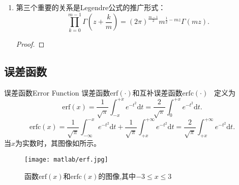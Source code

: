 \begin{property}
\begin{enumerate}[noitemsep]
\begin{enumerate}
			\item 第三个重要的关系是Legendre公式的推广形式：
			\begin{equation}
			\prod _{k=0}^{m-1}{\Gamma\left(z+\frac {k}{m}\right)}=\left(2\pi\right)^{\frac{m-1}{2}}m^{\frac{1}{2}-mz}\Gamma \left(mz \right).
			\end{equation}
			\begin{proof}
			\end{proof}
		\end{enumerate}
		
	\end{enumerate}
	
\end{property}


\subsection{误差函数}


\begin{definition}{误差函数}{Error Function}
	误差函数$\mathrm{erf}  \left(\cdot \right)$和互补误差函数$ \mathrm{erfc} \left(\cdot \right)$  ~\cite{Wiki-Error-function}定义为
	\begin{equation}
		\mathrm{erf}  \left(x \right) = \frac{1}{\sqrt{\pi}}\int_{-x}^{+x}{e^{-t^2}\mathrm{d}t} =  \frac{2}{\sqrt{\pi}}\int_{0}^{+x}{e^{-t^2}\mathrm{d}t} .
	\end{equation}
	\begin{equation}
	\mathrm{erfc}  \left(x \right) = \frac{1}{\sqrt{\pi}}\int_{-\infty}^{-x}{e^{-t^2}\mathrm{d}t}+\frac{1}{\sqrt{\pi}}\int_{+x}^{+\infty}{e^{-t^2}\mathrm{d}t} =  \frac{2}{\sqrt{\pi}}\int_{+x}^{+\infty}{e^{-t^2}\mathrm{d}t} .
	\end{equation}
	当$x$为实数时，其图像如所示。
\end{definition}

\begin{figure}[ht]
	\centering
	\texttt{[image: matlab/erf.jpg]}
	\caption{函数$ \mathrm{erf} \left(x\right)$和$ \mathrm{erfc} \left(x\right)$的图像,其中$-3\le x \le 3$\label{fig:erffig}}
\end{figure}

